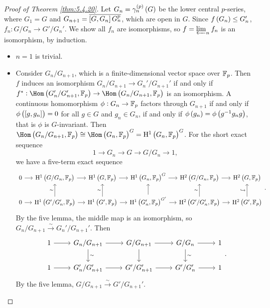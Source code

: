 \begin{proof}[Proof of Theorem \ref{thm:5.4.20}]
Let $ G_n = \gamma_n^{\br{p}}\br{G} $ be the lower central $ p $-series, where $ G_1 = G $ and $ G_{n + 1} = \overline{\sbr{G, G_n}G_n^p} $, which are open in $ G $. Since $ f\br{G_n} \le G_n' $, $ f_n : G / G_n \to G' / G_n' $. We show all $ f_n $ are isomorphisms, so $ f = \varprojlim_n f_n $ is an isomorphism, by induction.
\begin{itemize}
\item $ n = 1 $ is trivial.
\item Consider $ G_n / G_{n + 1} $, which is a finite-dimensional vector space over $ \mathbb{F}_p $. Then $ f $ induces an isomorphism $ G_n / G_{n + 1} \to G_n' / G_{n + 1}' $ if and only if $ f^* : \Hom\br{G_n' / G_{n + 1}', \FF_p} \to \Hom\br{G_n / G_{n + 1}, \FF_p} $ is an isomorphism. A continuous homomorphism $ \phi : G_n \to \mathbb{F}_p $ factors through $ G_{n + 1} $ if and only if $ \phi\br{\sbr{g, g_n}} = 0 $ for all $ g \in G $ and $ g_n \in G_n $, if and only if $ \phi\br{g_n} = \phi\br{g^{-1}g_ng} $, that is $ \phi $ is $ G $-invariant. Then $ \Hom\br{G_n / G_{n + 1}, \FF_p} \cong \Hom\br{G_n, \FF_p}^G = \H^1\br{G_n, \FF_p}^G $. For the short exact sequence
$$ 1 \to G_n \to G \to G / G_n \to 1, $$
we have a five-term exact sequence
$$
\begin{tikzcd}[column sep=small]
0 \arrow{r} & \H^1\br{G / G_n, \FF_p} \arrow{r} & \H^1\br{G, \FF_p} \arrow{r} & \H^1\br{G_n, \FF_p}^G \arrow{r} & \H^2\br{G / G_n, \FF_p} \arrow{r} & \H^2\br{G, \FF_p} \\
0 \arrow{r} & \H^1\br{G' / G_n', \FF_p} \arrow{u}{\sim} \arrow{r} & \H^1\br{G', \FF_p} \arrow{u}{\sim} \arrow{r} & \H^1\br{G_n', \FF_p}^{G'} \arrow{u} \arrow{r} & \H^2\br{G' / G_n', \FF_p} \arrow{u}{\sim} \arrow{r} & \H^2\br{G', \FF_p} \arrow{u}{\hookrightarrow}
\end{tikzcd}.
$$
By the five lemma, the middle map is an isomorphism, so $ G_n / G_{n + 1} \xrightarrow{\sim} G_n' / G_{n + 1}' $. Then
$$
\begin{tikzcd}
1 \arrow{r} & G_n / G_{n + 1} \arrow{r} \arrow{d}{\sim} & G / G_{n + 1} \arrow{r} \arrow{d} & G / G_n \arrow{r} \arrow{d}{\sim} & 1 \\
1 \arrow{r} & G_n' / G_{n + 1}' \arrow{r} & G' / G_{n + 1}' \arrow{r} & G' / G_n' \arrow{r} & 1
\end{tikzcd}.
$$
By the five lemma, $ G / G_{n + 1} \xrightarrow{\sim} G' / G_{n + 1}' $.
\end{itemize}
\end{proof}

